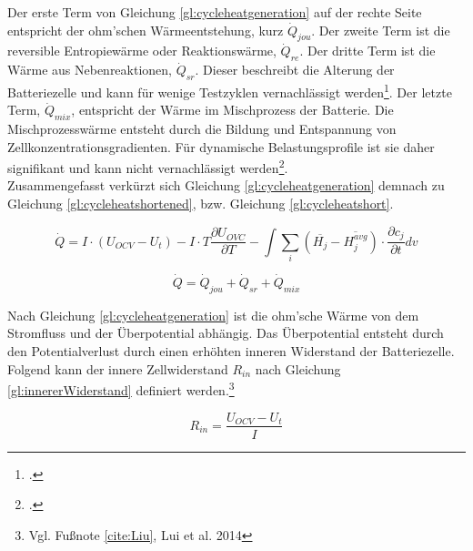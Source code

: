 Der erste Term von Gleichung \ref{gl:cycleheatgeneration} auf der rechte Seite entspricht der ohm'schen Wärmeentstehung, kurz $\dot{Q}_{jou}$. Der zweite Term ist die reversible Entropiewärme oder Reaktionswärme, $\dot{Q}_{re}$. Der dritte Term ist die Wärme aus Nebenreaktionen, $\dot{Q}_{sr}$. Dieser beschreibt die Alterung der Batteriezelle und kann für wenige Testzyklen vernachlässigt werden\footcite[Vgl.][]{Forgez2010}. Der letzte Term, $\dot{Q}_{mix}$, entspricht der Wärme im Mischprozess der Batterie. Die Mischprozesswärme entsteht durch die Bildung und Entspannung von Zellkonzentrationsgradienten. Für dynamische Belastungsprofile ist sie daher signifikant und kann nicht vernachlässigt werden\footcite[Vgl.][]{Thomas2003}. \\
Zusammengefasst verkürzt sich Gleichung \ref{gl:cycleheatgeneration} demnach zu Gleichung \ref{gl:cycleheatshortened}, bzw. Gleichung \ref{gl:cycleheatshort}.

\begin{equation}\label{gl:cycleheatshortened}
	\dot{Q} = I \cdot (U_{OCV} - U_{t})
	- I \cdot T \frac{\partial U_{OVC}}{\partial T}
	- \int \sum_{i}^{ } (\overline{H_{j}} - \overline{H_{j}^{avg}})	\cdot \frac{\partial c_{j}}{\partial t} dv
\end{equation}

\begin{equation}\label{gl:cycleheatshort}
	\dot{Q} = \dot{Q}_{jou} + \dot{Q}_{sr} + \dot{Q}_{mix}
\end{equation}

Nach Gleichung \ref{gl:cycleheatgeneration} ist die ohm'sche Wärme von dem Stromfluss und der Überpotential abhängig. Das Überpotential entsteht durch den Potentialverlust durch einen erhöhten inneren Widerstand der Batteriezelle.\\
Folgend kann der innere Zellwiderstand $R_{in}$ nach Gleichung \ref{gl:innererWiderstand} definiert werden.\footnote{Vgl. Fußnote \ref{cite:Liu}, Lui et al. 2014}

\begin{equation}\label{gl:innererWiderstand}
	R_{in} = \frac{U_{OCV} - U_{t}}{I}
\end{equation}

